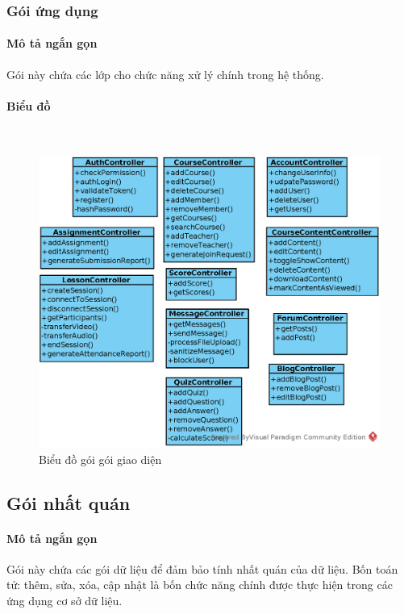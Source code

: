 \documentclass[./../main_file.tex]{subfiles}
\begin{document}
	\subsubsection{Gói ứng dụng}
	\paragraph{Mô tả ngắn gọn}
	Gói này chứa các lớp cho chức năng xử lý chính trong hệ thống.
	\paragraph{Biểu đồ}~\\
	\begin{figure}[H]
		\centering
		\includegraphics[width=\linewidth]{./images/application_package.eps}
		\caption{Biểu đồ gói gói giao diện}
	\end{figure}
	\subsection{Gói nhất quán}
	\paragraph{Mô tả ngắn gọn}
	Gói này chứa các gói dữ liệu để đảm bảo tính nhất quán của dữ liệu. Bốn toán tử: thêm, sửa, xóa, cập nhật là bốn chức năng chính được thực hiện trong các ứng dụng cơ sở dữ liệu.
\end{document}
